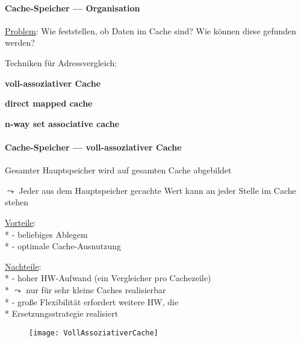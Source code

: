 \paragraph{Cache-Speicher --- Organisation}
\begin{items}
	\item \underline{Problem}: Wie feststellen, ob Daten im Cache sind? Wie können diese gefunden werden?
	\item Techniken für Adressvergleich:
	\begin{enumeration}
		\item \textbf{voll-assoziativer Cache}
		\item \textbf{direct mapped cache}
		\item \textbf{n-way set associative cache}
	\end{enumeration}
\end{items}

\paragraph{Cache-Speicher --- voll-assoziativer Cache}
\begin{items}
	\item Gesamter Hauptspeicher wird auf gesamten Cache abgebildet
	\item \( \leadsto \) Jeder aus dem Hauptspeicher gecachte Wert kann an jeder Stelle im Cache stehen
	\item \underline{Vorteile}: \\*
		- beliebiges Ablegem \\*
		- optimale Cache-Ausnutzung
	\item \underline{Nachteile}: \\*
		- hoher HW-Aufwand (ein Vergleicher pro Cachezeile) \\*
			\phantom{-} \( \leadsto \) nur für sehr kleine Caches realisierbar\\*
		- große Flexibilität erfordert weitere HW, die \\* \phantom{-} Ersetzungsstrategie realisiert
\end{items}
\begin{figure}[H]\centering\label{VollAssoziativerCache}\texttt{[image: VollAssoziativerCache]}\end{figure}

